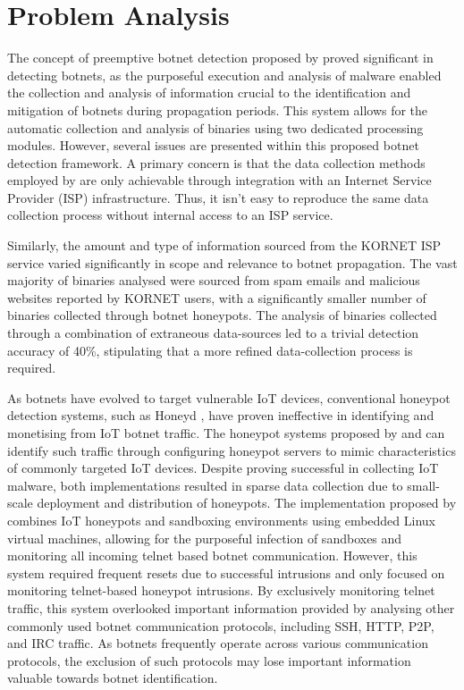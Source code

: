 
\chapter{Problem Analysis}

The concept of preemptive botnet detection proposed by \citet{Moon2012} proved significant in detecting botnets, as the purposeful execution and analysis of malware enabled the collection and analysis of information crucial to the identification and mitigation of botnets during propagation periods. This system allows for the automatic collection and analysis of binaries using two dedicated processing modules. However, several issues are presented within this proposed botnet detection framework. A primary concern is that the data collection methods employed by \citet{Moon2012} are only achievable through integration with an Internet Service Provider (ISP) infrastructure. Thus, it isn't easy to reproduce the same data collection process without internal access to an ISP service.

Similarly, the amount and type of information sourced from the KORNET ISP service varied significantly in scope and relevance to botnet propagation. The vast majority of binaries analysed were sourced from spam emails and malicious websites reported by KORNET users, with a significantly smaller number of binaries collected through botnet honeypots. The analysis of binaries collected through a combination of extraneous data-sources led to a trivial detection accuracy of 40\%, stipulating that a more refined data-collection process is required.

As botnets have evolved to target vulnerable IoT devices, conventional honeypot detection systems, such as Honeyd \citep{Honeyd2008}, have proven ineffective in identifying and monetising from IoT botnet traffic. The honeypot systems proposed by \citep{PaPa2016} and \citep{Antonakakis2017} can identify such traffic through configuring honeypot servers to mimic characteristics of commonly targeted IoT devices. Despite proving successful in collecting IoT malware, both implementations resulted in sparse data collection due to small-scale deployment and distribution of honeypots. The implementation proposed by \citep{PaPa2016} combines IoT honeypots and sandboxing environments using embedded Linux virtual machines, allowing for the purposeful infection of sandboxes and monitoring all incoming telnet based botnet communication. However, this system required frequent resets due to successful intrusions and only focused on monitoring telnet-based honeypot intrusions. By exclusively monitoring telnet traffic, this system overlooked important information provided by analysing other commonly used botnet communication protocols, including SSH, HTTP, P2P, and IRC traffic. As botnets frequently operate across various communication protocols, the exclusion of such protocols may lose important information valuable towards botnet identification.

